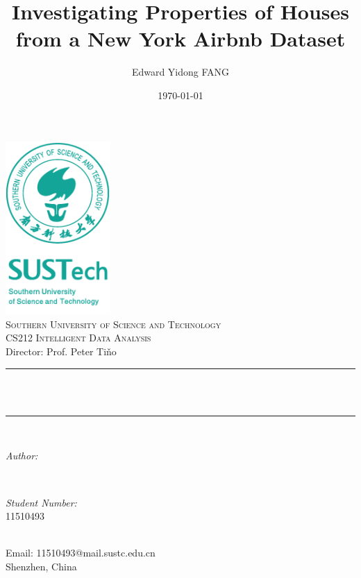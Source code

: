 \documentclass[12pt]{article}
\title{Investigating Properties of Houses from a New York Airbnb Dataset}                             %
\author{Edward Yidong FANG}                               %
\date{\today}                                           %
\makeatletter
\let\thetitle\@title
\let\theauthor\@author
\let\thedate\@date
\makeatother
\begin{document}

\begin{titlepage}
    \centering
    \vspace*{0.5 cm}
    \includegraphics[width=0.3\textwidth, trim = {0 90px 0 0}, clip]{images/sustclogo.png}\\[0.0 cm]   %
    \textsc{\Large Southern University of Science and Technology}\\[2.0 cm]  
    \textsc{\Large CS212 Intelligent Data Analysis}\\[0.5 cm]               
    \large Director: Prof. Peter Ti\v{n}o\\[0.5 cm]             
    \rule{\linewidth}{0.2 mm} \\[0.4 cm]
    { \huge \bfseries \thetitle}\\
    \rule{\linewidth}{0.2 mm} \\[1.5 cm]
    
    \begin{minipage}{0.4\textwidth}
        \begin{flushleft} \large
            \emph{Author:}\\
            \theauthor
            \end{flushleft}
            \end{minipage}~
            \begin{minipage}{0.4\textwidth}
            \begin{flushright} \large
            \emph{Student Number:} \\
            11510493                                   %
        \end{flushright}
    \end{minipage}\\[1 cm]
    Email: 11510493@mail.sustc.edu.cn\\[1 cm]
    {\large Shenzhen, China \thedate}\\[2 cm]
    \vfill
\end{titlepage}
\end{document}
